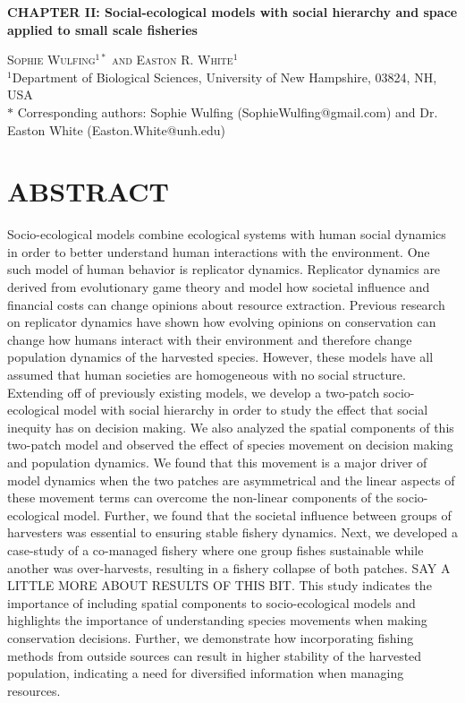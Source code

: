 \documentclass[
  12pt,
]{article}
\author{}
\date{\vspace{-2.5em}}
\begin{document}
\doublespacing

\begin{center}
    
\textbf{\Large CHAPTER II: Social-ecological models with social hierarchy and space applied to small scale fisheries}
    
\textsc{Sophie Wulfing$^{1*}$ and Easton R. White$^{1}$\\}
\vspace{3 mm}
\normalsize{\indent $^1$Department of Biological Sciences, University of New Hampshire, 03824, NH, USA\\}
$\text{*}$ Corresponding authors: Sophie Wulfing (SophieWulfing@gmail.com) and Dr. Easton White (Easton.White@unh.edu)
\end{center}

\newpage

\hypertarget{abstract}{%
\section{ABSTRACT}\label{abstract}}

Socio-ecological models combine ecological systems with human social dynamics in order to better understand human interactions with the environment. One such model of human behavior is replicator dynamics. Replicator dynamics are derived from evolutionary game theory and model how societal influence and financial costs can change opinions about resource extraction. Previous research on replicator dynamics have shown how evolving opinions on conservation can change how humans interact with their environment and therefore change population dynamics of the harvested species. However, these models have all assumed that human societies are homogeneous with no social structure. Extending off of previously existing models, we develop a two-patch socio-ecological model with social hierarchy in order to study the effect that social inequity has on decision making. We also analyzed the spatial components of this two-patch model and observed the effect of species movement on decision making and population dynamics. We found that this movement is a major driver of model dynamics when the two patches are asymmetrical and the linear aspects of these movement terms can overcome the non-linear components of the socio-ecological model. Further, we found that the societal influence between groups of harvesters was essential to ensuring stable fishery dynamics. Next, we developed a case-study of a co-managed fishery where one group fishes sustainable while another was over-harvests, resulting in a fishery collapse of both patches. SAY A LITTLE MORE ABOUT RESULTS OF THIS BIT. This study indicates the importance of including spatial components to socio-ecological models and highlights the importance of understanding species movements when making conservation decisions. Further, we demonstrate how incorporating fishing methods from outside sources can result in higher stability of the harvested population, indicating a need for diversified information when managing resources.
\end{document}
